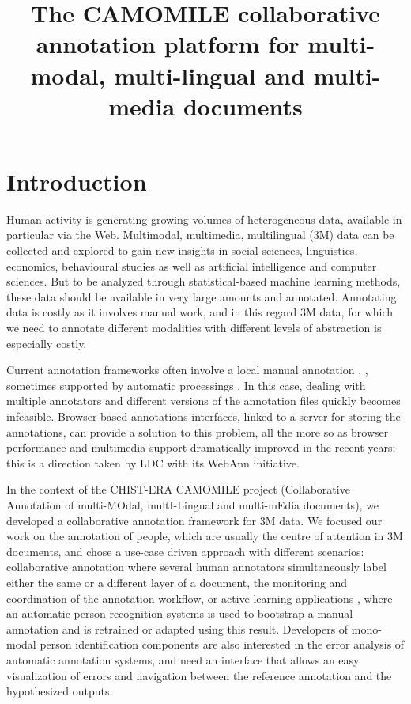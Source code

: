 \documentclass[10pt, a4paper]{article}
\title{The CAMOMILE collaborative annotation platform for multi-modal, multi-lingual and multi-media documents}
\begin{document}
\maketitleabstract

\section{Introduction}

Human activity is generating growing volumes of heterogeneous data, available in particular via the Web. Multimodal, multimedia, multilingual (3M) data can be collected and explored to gain new insights in social sciences, linguistics, economics, behavioural studies as well as artificial intelligence and computer sciences. But to be analyzed through statistical-based machine learning methods, these data should be available in very large amounts and annotated. Annotating data is costly as it involves manual work, and in this regard 3M data, for which we need to annotate different modalities with different levels of abstraction is especially costly.

Current annotation frameworks often involve a local manual annotation \cite{Maeda2004}, \cite{Kipp2001}, \cite{Mihalcik} sometimes supported by automatic processings \cite{Auer2010}. In this case, dealing with multiple annotators and different versions of the annotation files quickly becomes infeasible. 
Browser-based annotations interfaces, linked to a server for storing the annotations, can provide a solution to this problem, all the more so as browser performance and multimedia support dramatically improved in the recent years; this is a direction taken by LDC with its WebAnn initiative.

In the context of the CHIST-ERA CAMOMILE project (Collaborative Annotation of multi-MOdal, multI-Lingual and multi-mEdia documents), we developed a collaborative annotation framework for 3M data.
We focused our work on the annotation of people, which are usually the centre of attention in 3M documents, and chose a use-case driven approach with different scenarios: collaborative annotation where several human annotators simultaneously label either the same or a different layer of a document, the monitoring and coordination of the annotation workflow, or active learning applications \cite{Ayache2008}, where an automatic person recognition systems is used to bootstrap a manual annotation and is retrained or adapted using this result. Developers of mono-modal person identification components are also interested in the error analysis of automatic annotation systems, and need an interface that allows an easy visualization of errors and navigation between the reference annotation and the hypothesized outputs.
\end{document}
